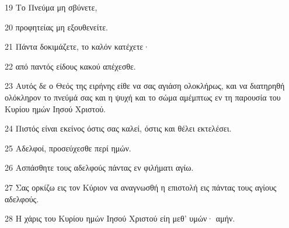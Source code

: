 \par 19 Το Πνεύμα μη σβύνετε,
\par 20 προφητείας μη εξουθενείτε.
\par 21 Πάντα δοκιμάζετε, το καλόν κατέχετε·
\par 22 από παντός είδους κακού απέχεσθε.
\par 23 Αυτός δε ο Θεός της ειρήνης είθε να σας αγιάση ολοκλήρως, και να διατηρηθή ολόκληρον το πνεύμά σας και η ψυχή και το σώμα αμέμπτως εν τη παρουσία του Κυρίου ημών Ιησού Χριστού.
\par 24 Πιστός είναι εκείνος όστις σας καλεί, όστις και θέλει εκτελέσει.
\par 25 Αδελφοί, προσεύχεσθε περί ημών.
\par 26 Ασπάσθητε τους αδελφούς πάντας εν φιλήματι αγίω.
\par 27 Σας ορκίζω εις τον Κύριον να αναγνωσθή η επιστολή εις πάντας τους αγίους αδελφούς.
\par 28 Η χάρις του Κυρίου ημών Ιησού Χριστού είη μεθ' υμών· αμήν.


